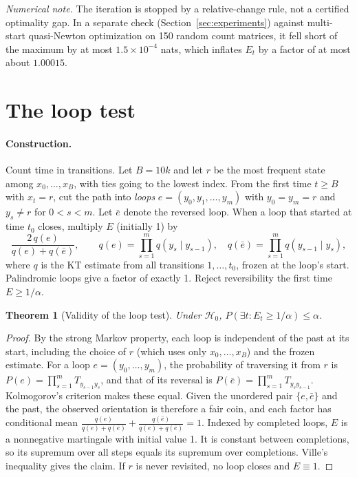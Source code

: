 \documentclass[11pt]{article}
\newtheorem{theorem}{Theorem}[section]
\theoremstyle{definition}
\theoremstyle{remark}
\newcommand{\Hnull}{\mathcal{H}_0}
\begin{document}
\emph{Numerical note.} The iteration is stopped by a relative-change rule, not a certified optimality gap. In a separate check (Section~\ref{sec:experiments}) against multi-start quasi-Newton optimization on 150 random count matrices, it fell short of the maximum by at most $1.5\times10^{-4}$ nats, which inflates $E_t$ by a factor of at most about $1.00015$.

\section{The loop test}\label{sec:loop}

\paragraph{Construction.} Count time in transitions. Let $B=10k$ and let $r$ be the most frequent state among $x_0,\dots,x_B$, with ties going to the lowest index. From the first time $t\ge B$ with $x_t=r$, cut the path into \emph{loops} $e=(y_0,y_1,\dots,y_m)$ with $y_0=y_m=r$ and $y_s\ne r$ for $0<s<m$. Let $\bar e$ denote the reversed loop. When a loop that started at time $t_0$ closes, multiply $E$ (initially 1) by
\[
\frac{2\,q(e)}{q(e)+q(\bar e)},\qquad q(e)=\prod_{s=1}^mq(y_s\mid y_{s-1}),\quad q(\bar e)=\prod_{s=1}^mq(y_{s-1}\mid y_s),
\]
where $q$ is the KT estimate from all transitions $1,\dots,t_0$, frozen at the loop's start. Palindromic loops give a factor of exactly 1. Reject reversibility the first time $E\ge1/\alpha$.

\begin{theorem}[Validity of the loop test]\label{thm:loop}
Under $\Hnull$, $P(\exists t:E_t\ge1/\alpha)\le\alpha$.
\end{theorem}
\begin{proof}
By the strong Markov property, each loop is independent of the past at its start, including the choice of $r$ (which uses only $x_0,\dots,x_B$) and the frozen estimate. For a loop $e=(y_0,\dots,y_m)$, the probability of traversing it from $r$ is $P(e)=\prod_{s=1}^mT_{y_{s-1}y_s}$, and that of its reversal is $P(\bar e)=\prod_{s=1}^mT_{y_sy_{s-1}}$. Kolmogorov's criterion makes these equal. Given the unordered pair $\{e,\bar e\}$ and the past, the observed orientation is therefore a fair coin, and each factor has conditional mean $\frac{q(e)}{q(e)+q(\bar e)}+\frac{q(\bar e)}{q(e)+q(\bar e)}=1$. Indexed by completed loops, $E$ is a nonnegative martingale with initial value 1. It is constant between completions, so its supremum over all steps equals its supremum over completions. Ville's inequality gives the claim. If $r$ is never revisited, no loop closes and $E\equiv1$.
\end{proof}
\end{document}
